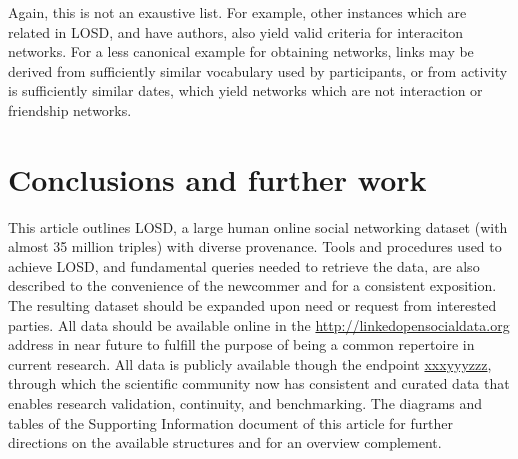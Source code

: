 \documentclass[journal,article,submit,moreauthors,pdftex]{Definitions/mdpi}
\begin{document}
Again, this is not an exaustive list.
For example, other instances which are related in LOSD, and have authors,
also yield valid criteria for interaciton networks.
For a less canonical example for obtaining networks, links may be derived from sufficiently similar vocabulary used by participants, or from activity is sufficiently similar dates, which yield networks which are not interaction or friendship networks.

\section{Conclusions and further work}
\label{conclusions}
This article outlines LOSD, a large human online social networking dataset (with almost 35 million triples) with diverse provenance.
Tools and procedures used to achieve LOSD, and fundamental queries needed to retrieve the data, are also described to the convenience of the newcommer
and for a consistent exposition.
The resulting dataset should be expanded upon need or request from interested parties.
All data should be available online in the \url{http://linkedopensocialdata.org}
address in near future to fulfill the purpose of being a common
repertoire in current research.
All data is publicly available though the endpoint \url{xxxyyyzzz},
through which the scientific community now has consistent and curated data
that enables research validation, continuity, and benchmarking.
The diagrams and tables of the Supporting Information document of this article
for further directions
on the available structures and for an overview complement.





\end{document}
